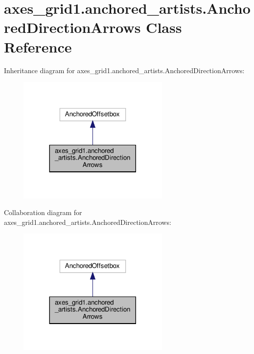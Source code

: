 \hypertarget{classaxes__grid1_1_1anchored__artists_1_1AnchoredDirectionArrows}{}\section{axes\+\_\+grid1.\+anchored\+\_\+artists.\+Anchored\+Direction\+Arrows Class Reference}
\label{classaxes__grid1_1_1anchored__artists_1_1AnchoredDirectionArrows}


Inheritance diagram for axes\+\_\+grid1.\+anchored\+\_\+artists.\+Anchored\+Direction\+Arrows\+:
\nopagebreak
\begin{figure}[H]
\begin{center}
\leavevmode
\includegraphics[width=212pt]{classaxes__grid1_1_1anchored__artists_1_1AnchoredDirectionArrows__inherit__graph}
\end{center}
\end{figure}


Collaboration diagram for axes\+\_\+grid1.\+anchored\+\_\+artists.\+Anchored\+Direction\+Arrows\+:
\nopagebreak
\begin{figure}[H]
\begin{center}
\leavevmode
\includegraphics[width=212pt]{classaxes__grid1_1_1anchored__artists_1_1AnchoredDirectionArrows__coll__graph}
\end{center}
\end{figure}
